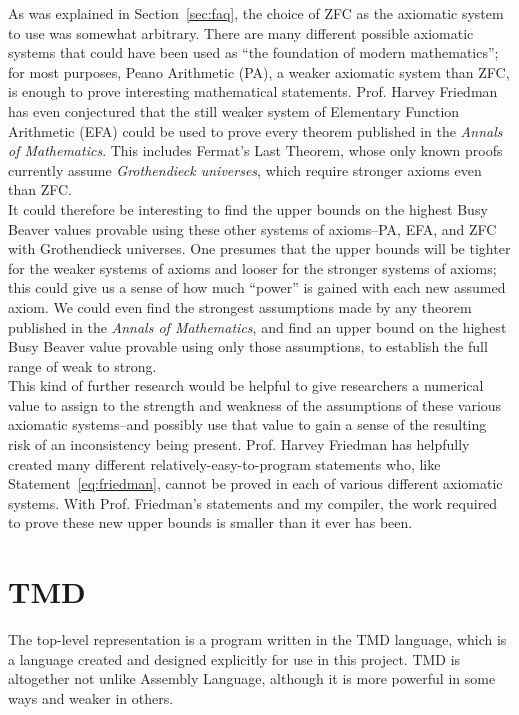 \documentclass{report}
\begin{document}
As was explained in Section~\ref{sec:faq}, the choice of ZFC as the axiomatic system to use was somewhat arbitrary. There are many different possible axiomatic systems that could have been used as ``the foundation of modern mathematics''; for most purposes, Peano Arithmetic (PA), a weaker axiomatic system than ZFC, is enough to prove interesting mathematical statements. Prof. Harvey Friedman has even conjectured that the still weaker system of Elementary Function Arithmetic (EFA) could be used to prove every theorem published in the \emph{Annals of Mathematics}. This includes Fermat's Last Theorem, whose only known proofs currently assume \emph{Grothendieck universes}, which require stronger axioms even than ZFC.  \\

It could therefore be interesting to find the upper bounds on the highest Busy Beaver values provable using these other systems of axioms--PA, EFA, and ZFC with Grothendieck universes. One presumes that the upper bounds will be tighter for the weaker systems of axioms and looser for the stronger systems of axioms; this could give us a sense of how much ``power'' is gained with each new assumed axiom. We could even find the strongest assumptions made by any theorem published in the \emph{Annals of Mathematics}, and find an upper bound on the highest Busy Beaver value provable using only those assumptions, to establish the full range of weak to strong.\\

This kind of further research would be helpful to give researchers a numerical value to assign to the strength and weakness of the assumptions of these various axiomatic systems--and possibly use that value to gain a sense of the resulting risk of an inconsistency being present. Prof. Harvey Friedman has helpfully created many different relatively-easy-to-program statements who, like Statement~\ref{eq:friedman}, cannot be proved in each of various different axiomatic systems. With Prof. Friedman's statements and my compiler, the work required to prove these new upper bounds is smaller than it ever has been.

\section{TMD}

The top-level representation is a program written in the TMD language, which is a language created and designed explicitly for use in this project. TMD is altogether not unlike Assembly Language, although it is more powerful in some ways and weaker in others. \\
\end{document}
